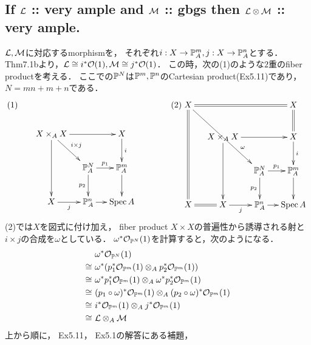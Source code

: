 \documentclass[a4paper]{jsarticle}
\begin{document}
    \subsection{If $\mathcal{L}$ :: very ample and $\mathcal{M}$ :: gbgs then $\mathcal{L} \otimes \mathcal{M}$ :: very ample.}
    $\mathcal{L}, \mathcal{M}$に対応するmorphismを，
    それぞれ$i: X \to \mathbb{P}^m_A, j: X \to \mathbb{P}^n_A$とする．
    Thm7.1bより，$\mathcal{L} \cong i^* \mathcal{O}(1), \mathcal{M} \cong j^* \mathcal{O}(1)$．
    この時，次の(1)のような$2$重のfiber productを考える．
    ここでの$\mathbb{P}^N$は$\mathbb{P}^m, \mathbb{P}^n$のCartesian product(Ex5.11)であり，
    $N=mn+m+n$である．
    \[
        (1)
        \xymatrix@C=12pt
        {
            {} & {} & {} & {} \\
            {} & X \times_A X \ar[rr]\ar[dd]\ar[rd]^-{i \times j}& {} &  X \ar[d]^-{i} \\
            {} & {} & \proj^{N}_A \ar[r]^-{p_1}\ar[d]_-{p_2}& \proj^m_A \ar[d] \\
            {}& X \ar[r]_-{j}& \proj^n_A \ar[r]& \Spec A
        }
        \hspace{40pt}
        (2)
        \xymatrix@C=12pt
        {
            X \ar@{=}[rrr]\ar@{=}[ddd]\ar@{->}[rrdd]^(.7){\omega}& {} & {} &  X \ar@{=}[d]\\
            {} & X \times_A X \ar[rr]\ar[dd]& {} &  X \ar[d]^-{i} \\
            {} & {} & \proj^{N}_A \ar[r]^-{p_1}\ar[d]_-{p_2}& \proj^m_A \ar[d] \\
            X \ar@{=}[r]& X \ar[r]_-{j}& \proj^n_A \ar[r]& \Spec A
        }
    \]
    (2)では$X$を図式に付け加え，
    fiber product $X \times X$の普遍性から誘導される射と$i \times j$の合成を$\omega$としている．
    $\omega^*\mathcal{O}_{\mathbb{P}^N}(1)$を計算すると，次のようになる．
    \begin{align*}
        {}&     ~\omega^*\mathcal{O}_{\mathbb{P}^N}(1) \\
        \cong&   ~\omega^* (p_1^* \mathcal{O}_{\mathbb{P}^m}(1) \otimes_A p_2^* \mathcal{O}_{\mathbb{P}^m}(1)) \\
        \cong&   ~\omega^* p_1^* \mathcal{O}_{\mathbb{P}^m}(1) \otimes_A \omega^* p_2^* \mathcal{O}_{\mathbb{P}^m}(1) \\
        \cong&   ~(p_1 \circ \omega)^* \mathcal{O}_{\mathbb{P}^m}(1) \otimes_A (p_2 \circ \omega)^* \mathcal{O}_{\mathbb{P}^m}(1) \\
        \cong&   ~i^* \mathcal{O}_{\mathbb{P}^m}(1) \otimes_A j^* \mathcal{O}_{\mathbb{P}^m}(1) \\
        \cong&   ~\mathcal{L} \otimes_A \mathcal{M}
    \end{align*}
    上から順に，
    Ex5.11，
    Ex5.1の解答にある補題，
\end{document}
